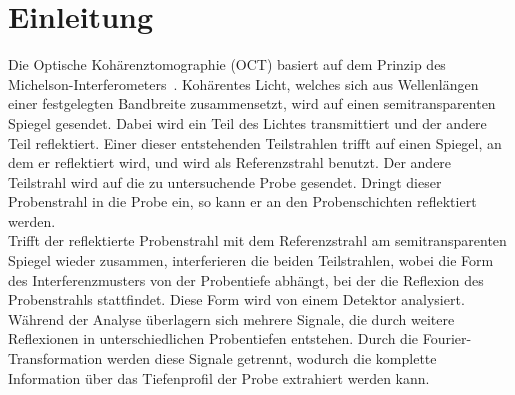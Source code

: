 \section{Einleitung}

Die Optische Kohärenztomographie (OCT) basiert auf dem Prinzip des Michelson-In\-ter\-fe\-ro\-me\-ters~\cite{OCT}. Kohärentes Licht, welches sich aus Wellenlängen einer festgelegten Bandbreite zusammensetzt, wird auf einen semitransparenten Spiegel gesendet.  Dabei wird ein Teil des Lichtes transmittiert und der andere Teil reflektiert. Einer dieser entstehenden Teilstrahlen trifft auf einen Spiegel, an dem er reflektiert wird, und wird als Referenzstrahl benutzt. Der andere Teilstrahl wird auf die zu untersuchende Probe gesendet. Dringt dieser Probenstrahl in die Probe ein, so kann er an den Probenschichten reflektiert werden. \\
Trifft der reflektierte Probenstrahl mit dem Referenzstrahl am semitransparenten Spiegel wieder zusammen, interferieren die beiden Teilstrahlen, wobei die Form des Interferenzmusters von der Probentiefe abhängt, bei der die Reflexion des Probenstrahls stattfindet. Diese Form wird von einem Detektor analysiert. Während der Analyse überlagern sich mehrere Signale, die durch weitere Reflexionen in unterschiedlichen Probentiefen entstehen. Durch die Fourier-Transformation werden diese Signale getrennt, wodurch die komplette Information über das Tiefenprofil der Probe extrahiert werden kann. \\
